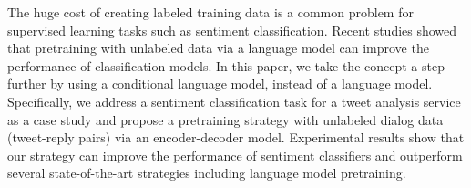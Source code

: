 The huge cost of creating labeled training data is a common problem for supervised learning tasks such as sentiment classification.  Recent studies showed that pretraining with unlabeled data via a language model can improve the performance of classification models.  In this paper, we take the concept a step further by using a conditional language model, instead of a language model.  Specifically, we address a sentiment classification task for a tweet analysis service as a case study and propose a pretraining strategy with unlabeled dialog data (tweet-reply pairs) via an encoder-decoder model. Experimental results show that our strategy can improve the performance of sentiment classifiers and outperform several state-of-the-art strategies including language model pretraining.
